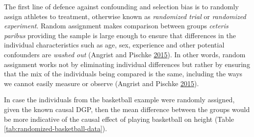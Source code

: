\documentclass[
]{book}
\begin{document}
The first line of defence against confounding and selection bias is to randomly assign athletes to treatment, otherwise known as \emph{randomized trial} or \emph{randomized experiment}. Random assignment makes comparison between groups \emph{ceteris paribus} providing the sample is large enough to ensure that differences in the individual characteristics such as age, sex, experience and other potential confounders are \emph{washed out} (Angrist and Pischke \protect\hyperlink{ref-angristMasteringMetricsPath2015}{2015}). In other words, random assignment works not by eliminating individual differences but rather by ensuring that the mix of the individuals being compared is the same, including the ways we cannot easily measure or observe (Angrist and Pischke \protect\hyperlink{ref-angristMasteringMetricsPath2015}{2015}).

In case the individuals from the basketball example were randomly assigned, given the known causal DGP, then the mean difference between the groups would be more indicative of the causal effect of playing basketball on height (Table \ref{tab:randomized-basketball-data}).
\end{document}

